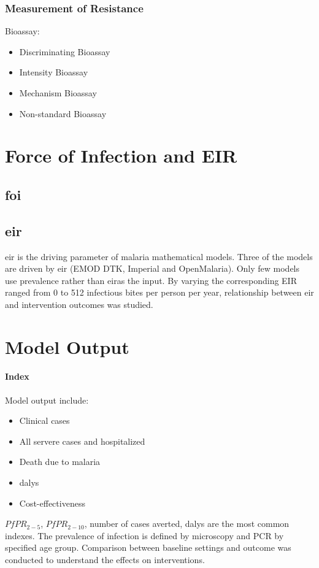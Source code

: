 \documentclass[a4paper, 12pt, twoside]{article}
\begin{document}
\subsubsection{Measurement of Resistance}

Bioassay:

\begin{itemize}
	\item Discriminating Bioassay
	\item Intensity Bioassay
	\item Mechanism Bioassay
	\item Non-standard Bioassay
\end{itemize}

\section{Force of Infection and EIR}%
\label{sec:force_of_infection_and_eir}

\subsection{\gls{foi}}%
\label{sub:foi}

\subsection{\gls{eir}}%
\label{sub:eir}
\gls{eir} is the driving parameter of malaria mathematical models.
Three of the models are driven by \gls{eir} (EMOD DTK, Imperial and OpenMalaria).
Only few models use prevalence rather than \gls{eir}as the input.
By varying the corresponding EIR ranged from 0 to 512 infectious bites per person per year, relationship between \gls{eir} and intervention outcomes was studied.

\section{Model Output}%
\label{sec:model_output}


\paragraph{Index}%
\label{par:index}
Model output include:
\begin{itemize}
	\item Clinical cases
	\item All servere cases and hospitalized
	\item Death due to malaria
	\item \gls{dalys}
	\item Cost-effectiveness
\end{itemize}
$PfPR_{2-5}$, $PfPR_{2-10}$\cite{Penny2016a}, number of cases averted, \gls{dalys} are the most common indexes.
The prevalence of infection is defined by microscopy and PCR by specified age group.
Comparison between baseline settings and outcome was conducted to understand the effects on interventions.
\end{document}
